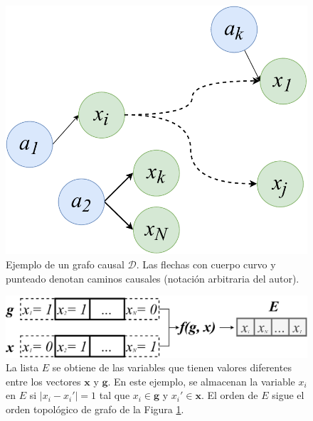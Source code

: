 \begin{figure}[h]
    \centering
    \includegraphics[scale=0.3]{Chapter4/Figs/examplegraph.pdf}
    \caption{Ejemplo de un grafo causal $\mathcal{D}$. Las flechas con cuerpo curvo y punteado denotan caminos causales (notación arbitraria del autor).}
    \label{fig:example-d}
\end{figure} 


\begin{figure}[h]
    \centering
    \includegraphics[scale=0.45]{Chapter4/Figs/listofinterest.pdf}
    \caption{La lista $E$ se obtiene de las variables que tienen valores diferentes entre los vectores $\mathbf{x}$ y $\mathbf{g}$. En este ejemplo, se almacenan la variable $x_i$ en $E$ si $|x_i - x_i' | = 1$ tal que $x_i\in \mathbf{g}$ y $x_i' \in \mathbf{x}$. El orden de $E$ sigue el orden topológico de grafo de la Figura \ref{fig:example-d}.}
    \label{fig:e-list}
\end{figure} 

